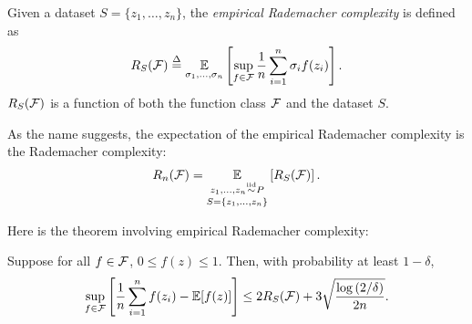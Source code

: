 \begin{definition}
Given a dataset $S = \{z_1, \dots, z_n\}$, the \textit{empirical Rademacher complexity} is defined as
\begin{equation}
R_S(\mathcal F) \overset{\Delta}{=} \operatorname*{\mathbb{E}}_{\sigma_1,\dots, \sigma_n} \left[ \sup_{f\in \mathcal F} \frac{1}{n} \sum^n_{i=1} \sigma_i f(z_i) \right].
\end{equation}
$R_S(\mathcal F)$ is a function of both the function class $\mathcal F$ and the dataset $S$.
\end{definition}

As the name suggests, the expectation of the empirical Rademacher complexity is the Rademacher complexity:
\begin{align}
    R_n(\mathcal F) = \underset{S=\{z_1,\dots, z_n\}}{\underset{z_1, \dots, z_n \overset{\textup{iid}}{\sim} P}{\operatorname*{\mathbb{E}}}}\left[ R_S(\mathcal F) \right].
\end{align}

Here is the theorem involving empirical Rademacher complexity:
\begin{theorem}\label{lec5:thm:thm2}
    Suppose for all $f \in \mathcal F$, $0 \leq f(z) \leq 1$. Then, with probability at least $1-\delta$,
    \begin{align}
        \sup_{f\in \mathcal F} \left[ \frac{1}{n} \sum^n_{i=1} f(z_i) - \operatorname*{\mathbb{E}}[f(z)] \right] \leq 2 R_S(\mathcal F) + 3\sqrt{\frac{\log{(2/\delta)}}{2n}}.
    \end{align}
\end{theorem}

